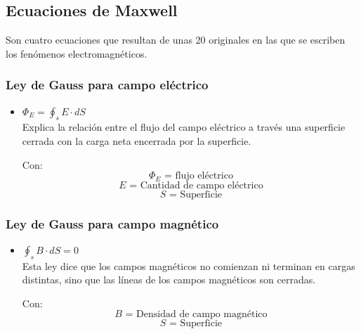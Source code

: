 \documentclass[letterpaper, 12pt]{article}
\begin{document}
    \subsection*{Ecuaciones de Maxwell}
    
    Son cuatro ecuaciones que resultan de unas 20 originales en las que se escriben los fenómenos electromagnéticos.
    
    \subsubsection*{Ley de Gauss para campo eléctrico}
    
    \begin{itemize}
        \item[\textcolor{Simbolos}{\boxdot}] $\Phi_{E} = \oint_{s}E \cdot dS$\\
        
        Explica la relación entre el flujo del campo eléctrico a través una superficie cerrada con la carga neta encerrada por la superficie.
        
        Con:
        $$\Phi_{E} \textrm{ =  flujo eléctrico}$$ 
        $$E \textrm{ =  Cantidad de campo eléctrico}$$ 
        $$S \textrm{ =  Superficie}$$ 
        
    \end{itemize}
    
    
     \pagestyle{fancy}
            \fancyhf{}
            \cfoot{\thepage}
                 
    
    \subsubsection*{Ley de Gauss para campo magnético}
    
    \begin{itemize}
        \item[\textcolor{Simbolos}{\boxdot}] $\oint_{s}B \cdot dS = 0 $\\
        
        Esta ley dice que los campos magnéticos no comienzan ni terminan en cargas distintas, sino que las líneas de los campos magnéticos son cerradas.
        
        Con:
        $$B \textrm{ =  Densidad de campo magnético}$$ 
        $$S \textrm{ =  Superficie}$$ 
        
    \end{itemize}
    
\end{document}
